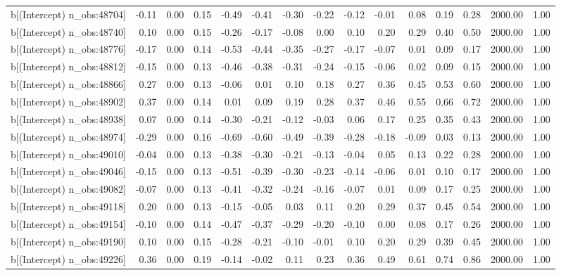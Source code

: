 \begin{table}[ht]
\begin{tabular}{rrrrrrrrrrrrrrr}
  b[(Intercept) n\_obs:48704] & -0.11 & 0.00 & 0.15 & -0.49 & -0.41 & -0.30 & -0.22 & -0.12 & -0.01 & 0.08 & 0.19 & 0.28 & 2000.00 & 1.00 \\ 
  b[(Intercept) n\_obs:48740] & 0.10 & 0.00 & 0.15 & -0.26 & -0.17 & -0.08 & 0.00 & 0.10 & 0.20 & 0.29 & 0.40 & 0.50 & 2000.00 & 1.00 \\ 
  b[(Intercept) n\_obs:48776] & -0.17 & 0.00 & 0.14 & -0.53 & -0.44 & -0.35 & -0.27 & -0.17 & -0.07 & 0.01 & 0.09 & 0.17 & 2000.00 & 1.00 \\ 
  b[(Intercept) n\_obs:48812] & -0.15 & 0.00 & 0.13 & -0.46 & -0.38 & -0.31 & -0.24 & -0.15 & -0.06 & 0.02 & 0.09 & 0.15 & 2000.00 & 1.00 \\ 
  b[(Intercept) n\_obs:48866] & 0.27 & 0.00 & 0.13 & -0.06 & 0.01 & 0.10 & 0.18 & 0.27 & 0.36 & 0.45 & 0.53 & 0.60 & 2000.00 & 1.00 \\ 
  b[(Intercept) n\_obs:48902] & 0.37 & 0.00 & 0.14 & 0.01 & 0.09 & 0.19 & 0.28 & 0.37 & 0.46 & 0.55 & 0.66 & 0.72 & 2000.00 & 1.00 \\ 
  b[(Intercept) n\_obs:48938] & 0.07 & 0.00 & 0.14 & -0.30 & -0.21 & -0.12 & -0.03 & 0.06 & 0.17 & 0.25 & 0.35 & 0.43 & 2000.00 & 1.00 \\ 
  b[(Intercept) n\_obs:48974] & -0.29 & 0.00 & 0.16 & -0.69 & -0.60 & -0.49 & -0.39 & -0.28 & -0.18 & -0.09 & 0.03 & 0.13 & 2000.00 & 1.00 \\ 
  b[(Intercept) n\_obs:49010] & -0.04 & 0.00 & 0.13 & -0.38 & -0.30 & -0.21 & -0.13 & -0.04 & 0.05 & 0.13 & 0.22 & 0.28 & 2000.00 & 1.00 \\ 
  b[(Intercept) n\_obs:49046] & -0.15 & 0.00 & 0.13 & -0.51 & -0.39 & -0.30 & -0.23 & -0.14 & -0.06 & 0.01 & 0.10 & 0.17 & 2000.00 & 1.00 \\ 
  b[(Intercept) n\_obs:49082] & -0.07 & 0.00 & 0.13 & -0.41 & -0.32 & -0.24 & -0.16 & -0.07 & 0.01 & 0.09 & 0.17 & 0.25 & 2000.00 & 1.00 \\ 
  b[(Intercept) n\_obs:49118] & 0.20 & 0.00 & 0.13 & -0.15 & -0.05 & 0.03 & 0.11 & 0.20 & 0.29 & 0.37 & 0.45 & 0.54 & 2000.00 & 1.00 \\ 
  b[(Intercept) n\_obs:49154] & -0.10 & 0.00 & 0.14 & -0.47 & -0.37 & -0.29 & -0.20 & -0.10 & 0.00 & 0.08 & 0.17 & 0.26 & 2000.00 & 1.00 \\ 
  b[(Intercept) n\_obs:49190] & 0.10 & 0.00 & 0.15 & -0.28 & -0.21 & -0.10 & -0.01 & 0.10 & 0.20 & 0.29 & 0.39 & 0.45 & 2000.00 & 1.00 \\ 
  b[(Intercept) n\_obs:49226] & 0.36 & 0.00 & 0.19 & -0.14 & -0.02 & 0.11 & 0.23 & 0.36 & 0.49 & 0.61 & 0.74 & 0.86 & 2000.00 & 1.00 \\ 

\end{tabular}
\end{table}
